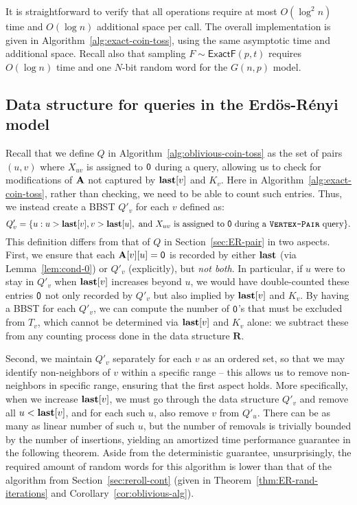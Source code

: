 It is straightforward to verify that all operations require at most $O(\log^2 n)$ time and $O(\log n)$ additional space per call. The overall implementation is given in Algorithm~\ref{alg:exact-coin-toss}, using the same asymptotic time and additional space. Recall also that sampling $F\sim\mathsf{ExactF}(p,t)$ requires $O(\log n)$ time and one $N$-bit random word for the $G(n,p)$ model.

\subsection{Data structure for  queries in the Erd\"{o}s-R\'{e}nyi model}\label{sec:det-er-pair}
Recall that we define $Q$ in Algorithm~\ref{alg:oblivious-coin-toss} as the  set of pairs $(u,v)$ where $X_{uv}$ is assigned to $\mathsf{0}$ during a  query, allowing us to check for modifications of $\mathbf{A}$ not captured by $\mathbf{last}[v]$ and $K_v$. Here in Algorithm~\ref{alg:exact-coin-toss}, rather than checking, we need to be able to count such entries. Thus, we instead create a BBST $Q'_v$ for each $v$ defined as:
\[Q'_v = \{u: u > \mathbf{last}[v], v > \mathbf{last}[u], \textrm{ and } X_{uv}\textrm{ is assigned to }\mathsf{0} \textrm{ during a \texttt{\textsc{Vertex-Pair}} query}\}.\]
This definition differs from that of $Q$ in Section~\ref{sec:ER-pair} in two aspects. First, we ensure that each $\mathbf{A}[v][u] = \mathsf{0}$ is recorded by either $\mathbf{last}$ (via Lemma~\ref{lem:cond-0}) or $Q'_v$ (explicitly), but \emph{not both}. In particular, if $u$ were to stay in $Q'_v$ when $\mathbf{last}[v]$ increases beyond $u$, we would have double-counted these entries $\mathsf{0}$ not only recorded by $Q'_v$ but also implied by $\mathbf{last}[v]$ and $K_v$. By having a BBST for each $Q'_v$, we can compute the number of $\mathsf{0}$'s that must be excluded from $T_v$, which cannot be determined via $\mathbf{last}[v]$ and $K_v$ alone: we subtract these from any counting process done in the data structure $\mathbf{R}$.

Second, we maintain $Q'_v$ separately for each $v$ as an ordered set, so that we may identify non-neighbors of $v$ within a specific range -- this allows us to remove non-neighbors in specific range, ensuring that the first aspect holds. More specifically, when we increase $\mathbf{last}[v]$, we must go through the data structure $Q'_v$ and remove all $u < \mathbf{last}[v]$, and for each such $u$, also remove $v$ from $Q'_u$. There can be as many as linear number of such $u$, but the number of removals is trivially bounded by the number of insertions, yielding an amortized time performance guarantee in the following theorem. Aside from the deterministic guarantee, unsurprisingly, the required amount of random words for this algorithm is lower than that of the algorithm from Section~\ref{sec:reroll-cont} (given in Theorem~\ref{thm:ER-rand-iterations} and Corollary~\ref{cor:oblivious-alg}).

